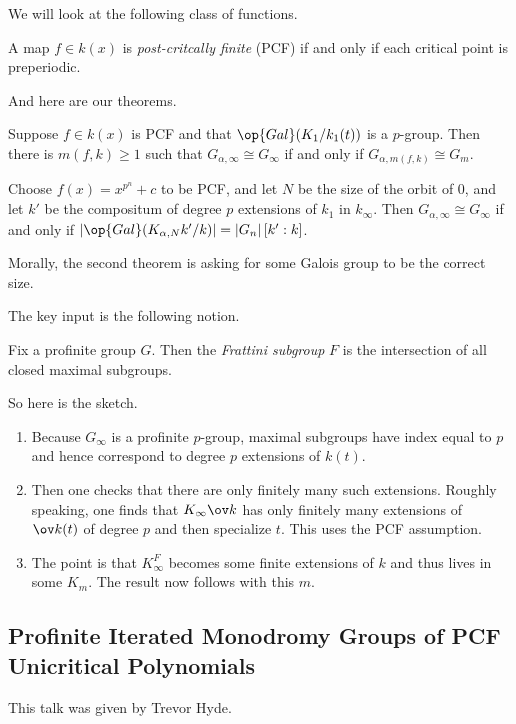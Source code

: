 \documentclass{article}
\begin{document}
We will look at the following class of functions.
\begin{definition}
	A map $f\in k(x)$ is \textit{post-critcally finite} (PCF) if and only if each critical point is preperiodic.
\end{definition}
And here are our theorems.
\begin{theorem}
	Suppose $f\in k(x)$ is PCF and that $\op{Gal}(K_1/k_1(t))$ is a $p$-group. Then there is $m(f,k)\ge1$ such that $G_{\alpha,\infty}\cong G_\infty$ if and only if $G_{\alpha,m(f,k)}\cong G_m$.
\end{theorem}
\begin{theorem}
	Choose $f(x)=x^{p^n}+c$ to be PCF, and let $N$ be the size of the orbit of $0$, and let $k'$ be the compositum of degree $p$ extensions of $k_1$ in $k_\infty$. Then $G_{\alpha,\infty}\cong G_\infty$ if and only if $\left|\op{Gal}(K_{\alpha,N}k'/k)\right|=\left|G_n\right|[k':k]$.
\end{theorem}
Morally, the second theorem is asking for some Galois group to be the correct size.

The key input is the following notion.
\begin{definition}[Frattini]
	Fix a profinite group $G$. Then the \textit{Frattini subgroup} $F$ is the intersection of all closed maximal subgroups.
\end{definition}
So here is the sketch.
\begin{enumerate}
	\item Because $G_\infty$ is a profinite $p$-group, maximal subgroups have index equal to $p$ and hence correspond to degree $p$ extensions of $k(t)$.
	\item Then one checks that there are only finitely many such extensions. Roughly speaking, one finds that $K_\infty\ov k$ has only finitely many extensions of $\ov k(t)$ of degree $p$ and then specialize $t$. This uses the PCF assumption.
	\item The point is that $K_\infty^F$ becomes some finite extensions of $k$ and thus lives in some $K_m$. The result now follows with this $m$.
\end{enumerate}

\subsection{Profinite Iterated Monodromy Groups of PCF Unicritical Polynomials}
This talk was given by Trevor Hyde.
\end{document}
